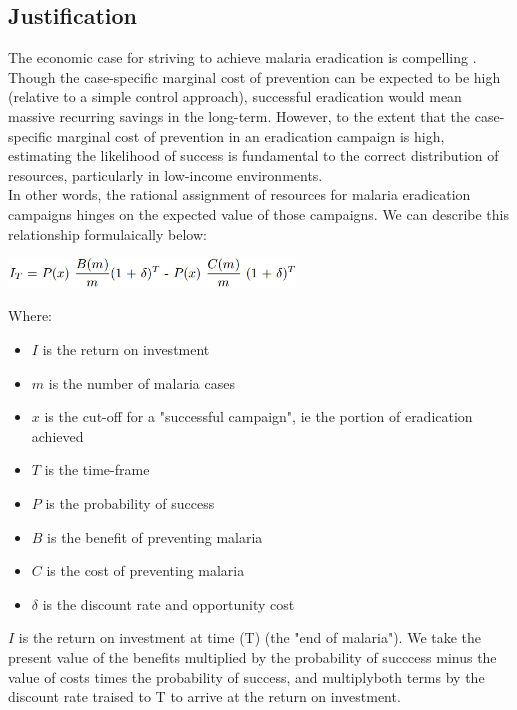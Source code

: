\documentclass{article}
\begin{document}
\subsection*{Justification}


\noindent The economic case for striving to achieve malaria eradication is compelling \cite{Barofsky2015}. Though the case-specific marginal cost of prevention can be expected to be high (relative to a simple control approach), successful eradication would mean massive recurring savings in the long-term. However, to the extent that the case-specific marginal cost of prevention in an eradication campaign is high, estimating the likelihood of success is fundamental to the correct distribution of resources, particularly in low-income environments. \\

\noindent In other words, the rational assignment of resources for malaria eradication campaigns hinges on the expected value of those campaigns. We can describe this relationship formulaically below: 

\begin{center}
\includegraphics[width=3in]{formula.png}
\end{center}

\noindent Where:
\begin{itemize}
\item $ I $ is the return on investment
\item $ m $ is the number of malaria cases
\item $ x $ is the cut-off for a "successful campaign", ie the portion of eradication achieved
\item $ T $ is the time-frame 
\item $ P $ is the probability of success
\item $ B $ is the benefit of preventing malaria
\item $ C $ is the cost of preventing malaria
\item $ \delta $ is the discount rate and opportunity cost
\end{itemize}

\noindent $ I $ is the return on investment at time (T) (the "end of malaria"). We take the present value of the benefits multiplied by the probability of succcess minus the value of costs times the probability of success, and multiplyboth terms by the discount rate traised to T to arrive at the return on investment. 
\end{document}
